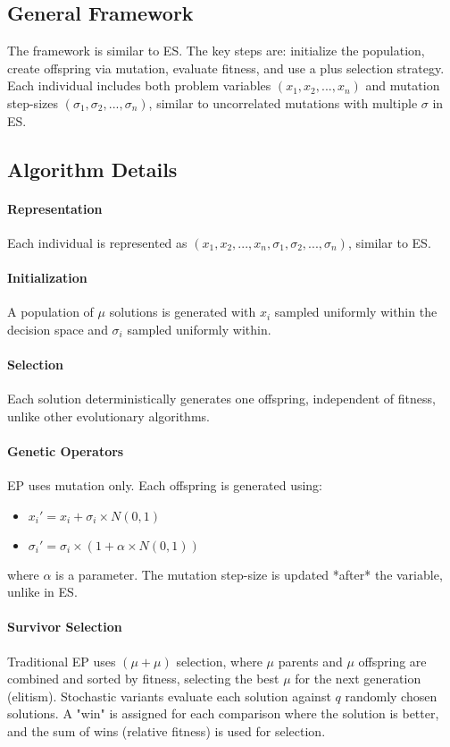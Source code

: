 \subsection*{General Framework}
The framework is similar to ES. The key steps are: initialize the population, create offspring via mutation, evaluate fitness, and use a plus selection strategy. Each individual includes both problem variables $(x_1, x_2, ..., x_n)$ and mutation step-sizes $(\sigma_1, \sigma_2, ..., \sigma_n)$, similar to uncorrelated mutations with multiple $\sigma$ in ES.

\subsection*{Algorithm Details}
\paragraph*{Representation} Each individual is represented as $(x_1, x_2, ..., x_n, \sigma_1, \sigma_2, ..., \sigma_n)$, similar to ES.
\paragraph*{Initialization} A population of $\mu$ solutions is generated with $x_i$ sampled uniformly within the decision space and $\sigma_i$ sampled uniformly within.
\paragraph*{Selection} Each solution deterministically generates one offspring, independent of fitness, unlike other evolutionary algorithms.
\paragraph*{Genetic Operators} EP uses mutation only. Each offspring is generated using:
\begin{itemize}
    \item $x_i' = x_i + \sigma_i \times N(0,1)$
    \item $\sigma_i' = \sigma_i \times (1 + \alpha \times N(0,1))$
\end{itemize}
where $\alpha$ is a parameter. The mutation step-size is updated *after* the variable, unlike in ES.
\paragraph*{Survivor Selection}
Traditional EP uses $(\mu + \mu)$ selection, where $\mu$ parents and $\mu$ offspring are combined and sorted by fitness, selecting the best $\mu$ for the next generation (elitism). Stochastic variants evaluate each solution against $q$ randomly chosen solutions. A "win" is assigned for each comparison where the solution is better, and the sum of wins (relative fitness) is used for selection.

